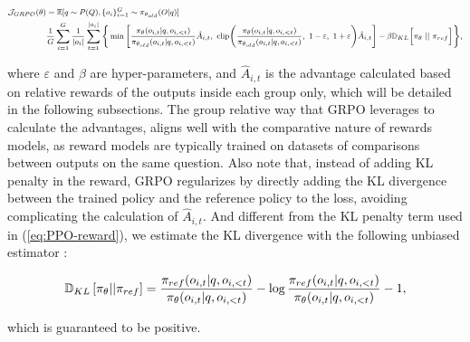 \begin{equation}
\footnotesize
\begin{split}
    \mathcal{J}_{GRPO}(\theta) &= \mathbb{E}{[q \sim P(Q), \{o_i\}_{i=1}^G \sim \pi_{\theta_{old}}(O|q)]}  \\
    & \frac{1}{G}\sum_{i=1}^G\frac{1}{|o_i|} \sum_{t=1}^{|o_i|} \Bigg\{ \min \Bigg[ \frac{\pi_\theta(o_{i,t} | q, o_{i,<t})}{\pi_{\theta_{old}}(o_{i,t} | q, o_{i,<t})} \hat{A}_{i,t},\ \text{clip} \Bigg( \frac{\pi_\theta(o_{i,t} | q, o_{i,<t})}{\pi_{\theta_{old}}(o_{i,t} | q, o_{i,<t})},\ 1 - \varepsilon,\ 1 + \varepsilon \Bigg) \hat{A}_{i,t} \Bigg] - \beta \mathbb{D}_{KL}\Big[\pi_{\theta}\ ||\ \pi_{ref}\Big]\Bigg\} ,
\end{split}
\label{eq:GRPO-obj}
\end{equation}

where $\varepsilon$ and $\beta$ are hyper-parameters, and $\hat{A}_{i,t}$  is the advantage calculated based on relative rewards of the outputs inside each group only, which will be detailed in the following subsections. The group relative way that GRPO leverages to calculate the advantages, aligns well with the comparative nature of rewards models,  as reward models are typically trained on datasets of comparisons between outputs on the same question. Also note that, instead of adding KL penalty in the reward, GRPO regularizes by directly adding the KL divergence between the trained policy and the reference policy to the loss, avoiding complicating the calculation of  $\hat{A}_{i,t}$. And different from the KL penalty term used in (\ref{eq:PPO-reward}), we estimate the KL divergence with the following unbiased estimator \citep{kl_approx}:

\begin{equation}
\small
    \mathbb{D}_{KL}\left[\pi_{\theta} || \pi_{ref}\right] = \frac{\pi_{ref}(o_{i,t}|q,o_{i,<t})}{\pi_{\theta}(o_{i,t}|q,o_{i,<t})}- \log\frac{\pi_{ref}(o_{i,t}|q,o_{i,<t})}{\pi_{\theta}(o_{i,t}|q,o_{i,<t})} - 1,
\end{equation}

which is guaranteed to be positive.

